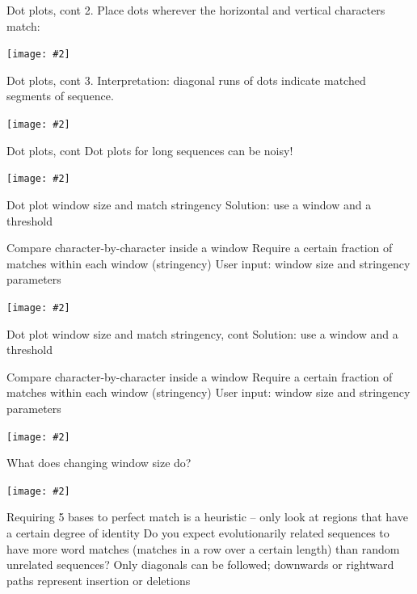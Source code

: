 \documentclass{beamer}
\renewcommand{\c}[1]{\begin{center}#1\end{center}}
\newcommand{\gr}[2][.95]{\c{\texttt{[image: \#2]}}}
\begin{document}
\begin{frame}{Dot plots, cont}
2. Place dots wherever the horizontal and vertical characters match:
\gr[.5]{l3_figs/s20_matrix.png}
\end{frame}

\begin{frame}{Dot plots, cont}
3. Interpretation: diagonal runs of dots indicate matched segments of sequence.
\gr[0.5]{l3_figs/s21_matrix.png}
\end{frame}

\begin{frame}{Dot plots, cont}
Dot plots for long sequences can be noisy!
\gr[0.5]{l3_figs/s23_dotplot.png}
\end{frame}

\begin{frame}{Dot plot window size and match stringency}
Solution: use a window and a threshold
\begin{outline}
\1 Compare character-by-character inside a window
\1 Require a certain fraction of matches within each window (stringency)
\1 User input: window size and stringency parameters 
\end{outline}
\gr[0.5]{l3_figs/s24_windows.png}
\end{frame}

\begin{frame}{Dot plot window size and match stringency, cont}
Solution: use a window and a threshold
\begin{outline}
\1 Compare character-by-character inside a window
\1 Require a certain fraction of matches within each window (stringency)
\1 User input: window size and stringency parameters 
\end{outline}
\gr[0.5]{l3_figs/s25_windows.png}
\end{frame}

\begin{frame}{What does changing window size do?}
\gr{l3_figs/s27_sizes.png}
\begin{outline}
    \2 Requiring 5 bases to perfect match is a heuristic – only look at regions that have a certain degree of identity
    \2 Do you expect evolutionarily related sequences to have more word matches (matches in a row over a certain length) than random unrelated sequences?
    \2 Only diagonals can be followed; downwards or rightward paths represent insertion or deletions
\end{outline}
\end{frame}
\end{document}
